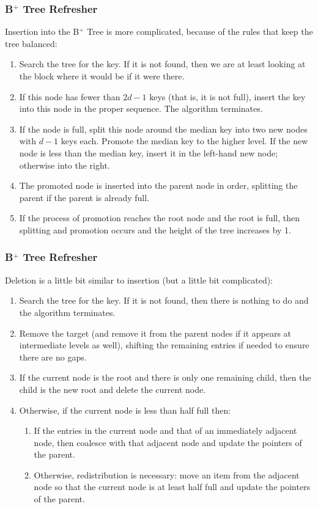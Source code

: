 \begin{frame}
\frametitle{B$^{+}$ Tree Refresher}

Insertion into the B$^{+}$ Tree is more complicated, because of the rules that keep the tree balanced:

\begin{enumerate}
	\item Search the tree for the key. If it is not found, then we are at least looking at the block where it would be if it were there.
	\item If this node has fewer than $2d-1$ keys (that is, it is not full), insert the key into this node in the proper sequence. The algorithm terminates.
	\item If the node is full, split this node around the median key into two new nodes with $d-1$ keys each. Promote the median key to the higher level. If the new node is less than the median key, insert it in the left-hand new node; otherwise into the right.
	\item The promoted node is inserted into the parent node in order, splitting the parent if the parent is already full.
	\item If the process of promotion reaches the root node and the root is full, then splitting and promotion occurs and the height of the tree increases by 1.
\end{enumerate}



\end{frame}

\begin{frame}
\frametitle{B$^{+}$ Tree Refresher}

Deletion is a little bit similar to insertion (but a little bit complicated):

\begin{enumerate}
	\item Search the tree for the key. If it is not found, then there is nothing to do and the algorithm terminates.
	\item Remove the target (and remove it from the parent nodes if it appears at intermediate levels as well), shifting the remaining entries if needed to ensure there are no gaps.
	\item If the current node is the root and there is only one remaining child, then the child is the new root and delete the current node.
	\item Otherwise, if the current node is less than half full then:
		\begin{enumerate}
			\item If the entries in the current node and that of an immediately adjacent node, then coalesce with that adjacent node and update the pointers of the parent.
			\item Otherwise, redistribution is necessary: move an item from the adjacent node so that the current node is at least half full and update the pointers of the parent.
		\end{enumerate}
\end{enumerate}



\end{frame}


